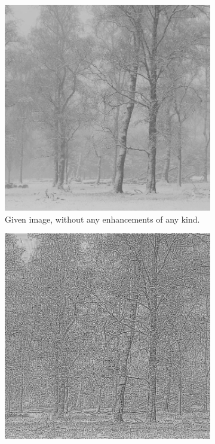 \documentclass[a4paper, landscape]{article}
\begin{document}
\begin{figure}
    \centering
    \begin{subfigure}{0.32\linewidth}
        \centering
        \includegraphics[height=0.4\textheight, keepaspectratio]{LC2.jpg}
        \caption{Given image, without any enhancements of any kind.}
        \label{lc2_orig}
    \end{subfigure}
    \begin{subfigure}{0.32\linewidth}
        \centering
        \includegraphics[height=0.4\textheight, keepaspectratio]{smol_enhanced_LC2.png}

\end{subfigure}
\end{figure}
\end{document}
